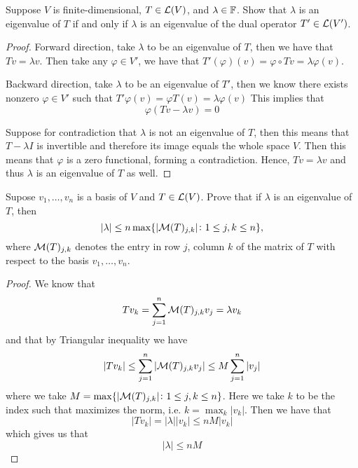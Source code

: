 \documentclass{extarticle}
\begin{document}
\begin{problem}{15}
    Suppose \(V\) is finite-dimensional, \(T \in \mathcal{L}(V)\), and \(\lambda \in \mathbb{F}\). Show that 
    \(\lambda\) is an eigenvalue of \(T\) if and only if \(\lambda\) is an eigenvalue of 
    the dual operator \(T' \in \mathcal{L}(V')\).
\end{problem}


\begin{proof}
Forward direction, take \(\lambda\) to be an eigenvalue of \(T\), then we have that \(Tv = \lambda v\). 
Then take any \(\varphi \in V'\), we have that \(T'(\varphi) (v)= \varphi \circ Tv 
= \lambda \varphi (v)\). 

Backward direction, take \(\lambda\) to be an eigenvalue of \(T'\), then we know there exists 
nonzero \(\varphi \in V'\) such that 
\(T' \varphi (v) = \varphi T(v) = \lambda \varphi (v)\) 
This implies that 
\[\varphi(Tv - \lambda v) = 0\]

Suppose for contradiction that \(\lambda\) is not an eigenvalue of \(T\), then this means that 
\(T - \lambda I\) is invertible and therefore its image equals the whole space \(V\). Then this 
means that \(\varphi\) is a zero functional, forming a contradiction. Hence, \(Tv = \lambda v\)
and thus \(\lambda\) is an eigenvalue of \(T\) as well. 


\end{proof}


\begin{problem}{16}
    Supose \(v_1, \ldots, v_n\) is a basis of \(V\) and \(T \in \mathcal{L}(V)\). Prove that if 
    \(\lambda\) is an eigenvalue of \(T\), then 
    \[|\lambda| \leq n \max \{|\mathcal{M}(T)_{j,k}|\colon 1 \leq j,k \leq n\},\]
    where \(\mathcal{M}(T)_{j,k}\) denotes the entry in row \(j\), column \(k\) of the matrix of 
    \(T\) with respect to the basis \(v_1, \ldots, v_n\). 
\end{problem}

\begin{proof}
We know that 
\[T v_k = \sum_{j=1}^{n} \mathcal{M}(T)_{j, k} v_j = \lambda v_k\]
and that by Triangular inequality we have 
\[|Tv_k| \leq \sum_{j=1}^{n} |\mathcal{M}(T)_{j, k} v_j| \leq M \sum_{j=1}^{n} |v_j|\]
where we take \(M = \max \{|\mathcal{M}(T)_{j,k}|\colon 1 \leq j,k \leq n\}\). Here we take 
\(k\) to be the index such that maximizes the norm, i.e. \(k = \max_k |v_k|\). Then we have that 
\[|T v_k| = |\lambda| |v_k| \leq nM |v_k|\]
which gives us that 
\[|\lambda| \leq nM\]
\end{proof}
\end{document}
